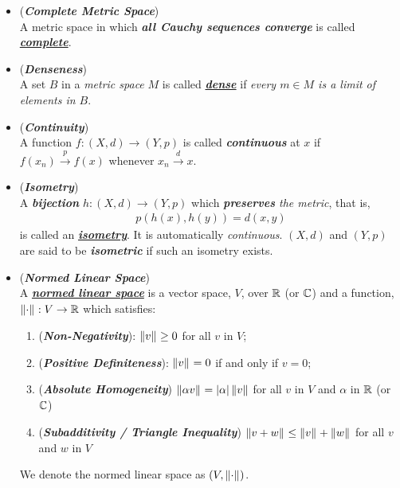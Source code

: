 \documentclass[11pt]{article}
\begin{document}
\begin{itemize}
\item \begin{definition}  (\emph{\textbf{Complete Metric Space}})\\
A metric space in which \emph{\textbf{all Cauchy sequences converge}} is called \underline{\emph{\textbf{complete}}}.
\end{definition}

\item \begin{definition}  (\emph{\textbf{Denseness}})\\
A set $B$ in a \emph{metric space} $M$ is called \underline{\emph{\textbf{dense}}} if \emph{every $m \in M$ is a limit of elements in $B$}.
\end{definition}

\item \begin{definition} (\emph{\textbf{Continuity}})\\
A function $f: (X, d) \rightarrow (Y, p)$ is called \emph{\textbf{continuous}} at $x$ if $f(x_n) \stackrel{p}{\rightarrow} f(x)$ whenever $x_n \stackrel{d}{\rightarrow} x$.
\end{definition}

\item \begin{definition}  (\emph{\textbf{Isometry}})\\
A \emph{\textbf{bijection}} $h: (X, d) \rightarrow (Y, p)$ which \emph{\textbf{preserves} the metric}, that is,
\begin{align*}
p(h(x), h(y)) = d(x, y)
\end{align*}
is called an \underline{\emph{\textbf{isometry}}}. It is automatically \emph{continuous}. $(X, d)$ and $(Y, p)$ are said to be \emph{\textbf{isometric}} if such an isometry exists.
\end{definition}

\item \begin{definition} (\emph{\textbf{Normed Linear Space}})\\
A \underline{\emph{\textbf{normed linear space}}} is a vector space, $V$, over ${\mathbb R}$ (or ${\mathbb C}$) and a function, $\left\|\cdot\right\|_{}: V \rightarrow {\mathbb R}$ which satisfies:
\begin{enumerate}
\item (\emph{\textbf{Non-Negativity}}): $\left\|v\right\|_{} \ge 0$ for all $v$ in $V$;
\item (\emph{\textbf{Positive Definiteness}}): $\left\|v\right\|_{} = 0$ if and only if $v = 0$;
\item (\emph{\textbf{Absolute Homogeneity}}) $\left\|\alpha v\right\|_{} = \left\lvert \alpha \right\rvert\left\|v\right\|_{}$ for all $v$ in $V$ and $\alpha$ in ${\mathbb R}$ (or ${\mathbb C}$)
\item (\emph{\textbf{Subadditivity / Triangle Inequality}}) $\left\|v + w\right\|_{}\le \left\|v\right\|_{} + \left\|w\right\|_{}$ for all $v$ and $w$ in $V$
\end{enumerate}
We denote the normed linear space as $(V, \left\|\cdot\right\|_{})$.
\end{definition}
\end{itemize}
\end{document}
